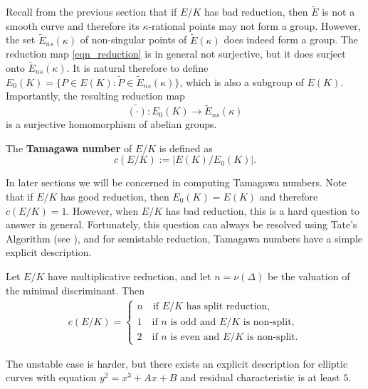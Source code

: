 Recall from the previous section that if $E/K$ has bad reduction, then $\tilde{E}$ is not a smooth curve and therefore its $\kappa$-rational points may not form a group. However, the set $\tilde{E}_{ns}(\kappa)$ of non-singular points of $\tilde{E}(\kappa)$ does indeed form a group. The reduction map \eqref{eqn_reduction} is in general not surjective, but it does surject onto $\tilde{E}_{ns}(\kappa)$. It is natural therefore to define $E_0(K)=\{P\in E(K):\widetilde{P}\in\tilde{E}_{ns}(\kappa)\}$, which is also a subgroup of $E(K)$. Importantly, the resulting reduction map 
$$\widetilde{(\cdot)}:E_0(K)\longrightarrow \tilde{E}_{ns}(\kappa)$$
is a surjective homomorphism of abelian groups.
\begin{defn}
    The \textbf{Tamagawa number} of $E/K$ is defined as
    \begin{equation}
        c(E/K):=|E(K)/E_0(K)|.
    \end{equation}
\end{defn}
In later sections we will be concerned in computing Tamagawa numbers. Note that if $E/K$ has good reduction, then $E_0(K)=E(K)$ and therefore $c(E/K)=1$. However, when $E/K$ has bad reduction, this is a hard question to answer in general. Fortunately, this question can always be resolved using Tate's Algorithm (see \cite[\S IV.9]{S2}), and for semistable reduction, Tamagawa numbers have a simple explicit description.

\begin{prop}
    Let $E/K$ have multiplicative reduction, and let $n=\nu(\Delta)$ be the valuation of the minimal discriminant. Then
    \begin{align*}
        c(E/K)=
        \begin{cases}
            n \quad\text{if $E/K$ has split reduction,}\\
            1 \quad\text{if $n$ is odd and $E/K$ is non-split,}\\
            2 \quad\text{if $n$ is even and $E/K$ is non-split}.
        \end{cases}    
    \end{align*}
\end{prop}

The unstable case is harder, but there exists an explicit description for elliptic curves with equation $y^2=x^3+Ax+B$ and residual characteristic is at least $5$. 

